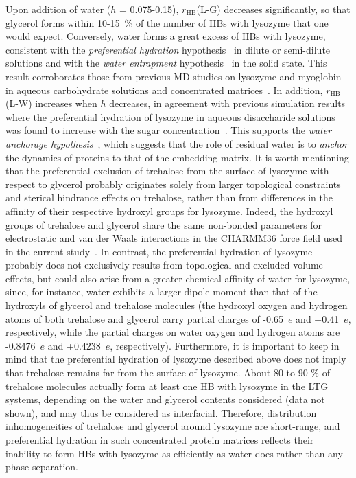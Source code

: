 \documentclass[journal=jpcbfk,manuscript=article]{achemso}
\begin{document}
\begin{singlespacing}
Upon addition of water ($h$ = 0.075-0.15), $r_{\textrm{HB}}$(L-G) decreases significantly,
so that glycerol forms within 10-15~\% of the number of HBs with lysozyme that one would expect. 
Conversely, water forms 
a great excess of HBs with lysozyme, consistent with the \textit{preferential hydration} hypothesis~\cite{Timasheff2002}
in dilute or semi-dilute solutions and with the \textit{water entrapment} hypothesis~\cite{Belton1994} in the solid 
state. This result corroborates those from previous MD studies on lysozyme and myoglobin in aqueous carbohydrate solutions 
and concentrated matrices~\cite{Cottone2002,Cottone2005,Lerbret2007,Lerbret2012,Corradini2013}.
In addition, $r_{\textrm{HB}}$(L-W) increases when $h$ decreases, in agreement with previous simulation results where 
the preferential hydration of lysozyme in aqueous disaccharide solutions was found to increase with the sugar 
concentration~\cite{Lerbret2007}. This supports the \textit{water anchorage hypothesis}~\cite{Cordone2005,Francia2008}, 
which suggests that the role of residual water is to \textit{anchor} the dynamics of proteins to that of the embedding matrix. 
It is worth mentioning that the preferential exclusion of trehalose from the surface of lysozyme with respect to glycerol probably 
originates solely from larger topological constraints and sterical hindrance effects on trehalose, rather than from 
differences in the affinity of their respective hydroxyl groups for lysozyme. Indeed, the hydroxyl groups of trehalose 
and glycerol share the same non-bonded parameters for electrostatic and van der Waals interactions in the CHARMM36 force 
field used in the current study~\cite{Guvench2008,Guvench2009,Hatcher2009}. 
In contrast, the preferential hydration of lysozyme probably does not exclusively results from 
topological and excluded volume effects, but could also arise from a greater chemical affinity of water for lysozyme, 
since, for instance, water exhibits a larger dipole moment than that of the hydroxyls of 
glycerol and trehalose molecules (the hydroxyl oxygen and hydrogen atoms of both trehalose and glycerol carry partial charges 
of -0.65~$e$ and +0.41~$e$, respectively, while the partial charges on water oxygen and hydrogen atoms are -0.8476~$e$
and +0.4238~$e$, respectively). Furthermore, it is important to keep in mind that the preferential hydration 
of lysozyme described above does not imply that trehalose 
remains far from the surface of lysozyme. About 80 to 90 \% of trehalose molecules actually form at least one HB with lysozyme 
in the LTG systems, depending on the water and glycerol contents considered (data not shown), and may thus be considered as interfacial. 
Therefore, distribution inhomogeneities of trehalose and glycerol around lysozyme are short-range, and preferential hydration 
in such concentrated protein matrices reflects their inability to form HBs with lysozyme as efficiently as water does rather than 
any phase separation.


\end{singlespacing}
\end{document}
